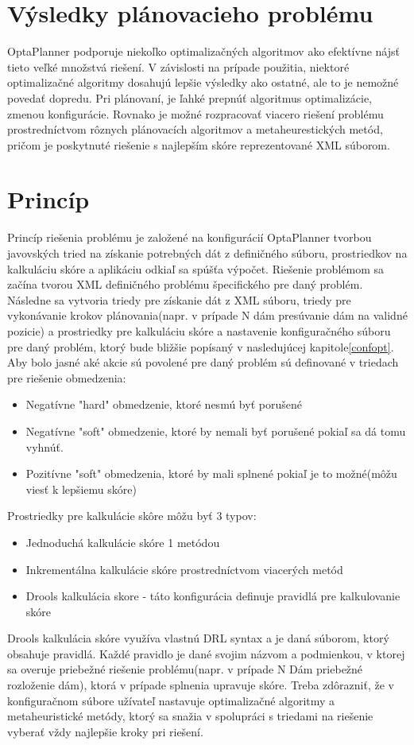 \section{Výsledky plánovacieho problému}
OptaPlanner podporuje niekoľko optimalizačných algoritmov ako efektívne nájsť tieto veľké množstvá riešení. V závislosti na prípade použitia, niektoré optimalizačné algoritmy dosahujú lepšie výsledky ako ostatné, ale to je nemožné povedať dopredu. Pri plánovaní, je ľahké prepnúť algoritmus optimalizácie, zmenou konfigurácie. Rovnako je možné rozpracovať viacero riešení problému prostredníctvom rôznych plánovacích algoritmov a metaheurestických metód, pričom je poskytnuté riešenie s najlepším skóre reprezentované XML súborom.



\section{Princíp}
Princíp riešenia problému je založené na konfigurácií OptaPlanner tvorbou javovských tried na získanie potrebných dát z definičného súboru, prostriedkov na kalkuláciu skóre a aplikáciu odkiaľ sa spúšťa výpočet. Riešenie problémom sa začína tvorou XML definičného problému špecifického pre daný problém. Následne sa vytvoria triedy pre získanie dát z XML súboru, triedy pre vykonávanie krokov plánovania(napr. v prípade N dám presúvanie dám na validné pozicie) a prostriedky pre kalkuláciu skóre a nastavenie konfiguračného súboru pre daný problém, ktorý bude bližšie popísaný v nasledujúcej kapitole\ref{confopt}. Aby bolo jasné aké akcie sú povolené pre daný problém sú definované v triedach pre riešenie obmedzenia:
\cite{optabook}
\begin{itemize}
\item Negatívne "hard" obmedzenie, ktoré nesmú byť porušené\label{hardobm}
\item Negatívne "soft" obmedzenie, ktoré by nemali byť porušené pokiaľ sa dá tomu vyhnúť.
\item Pozitívne "soft" obmedzenia, ktoré by mali splnené pokiaľ je to možné(môžu viesť k lepšiemu skóre)
\end{itemize}

 Prostriedky pre kalkulácie skôre môžu byť 3 typov:
\begin{itemize}\label{skorkal}
\item Jednoduchá kalkulácie skóre 1 metódou
\item Inkrementálna kalkulácie skóre prostredníctvom viacerých metód
\item Drools kalkulácia skore - táto konfigurácia definuje pravidlá pre kalkulovanie skóre\label{drollskal}
\end{itemize}
Drools kalkulácia skóre využíva vlastnú DRL syntax a je daná súborom, ktorý obsahuje pravidlá. Každé pravidlo je dané svojim názvom a podmienkou, v ktorej sa overuje priebežné riešenie problému(napr. v prípade N Dám priebežné rozloženie dám), ktorá v prípade splnenia upravuje skóre. Treba zdôrazniť, že v konfiguračnom súbore užívateľ nastavuje optimalizačné algoritmy a metaheuristické metódy, ktorý sa snažia v spolupráci s triedami na riešenie vyberať vždy najlepšie kroky pri riešení.

